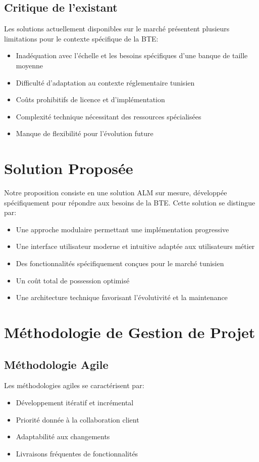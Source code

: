 \documentclass[12pt,a4paper]{report}
\begin{document}
\subsection{Critique de l'existant}
Les solutions actuellement disponibles sur le marché présentent plusieurs limitations pour le contexte spécifique de la BTE:
\begin{itemize}
    \item Inadéquation avec l'échelle et les besoins spécifiques d'une banque de taille moyenne
    \item Difficulté d'adaptation au contexte réglementaire tunisien
    \item Coûts prohibitifs de licence et d'implémentation
    \item Complexité technique nécessitant des ressources spécialisées
    \item Manque de flexibilité pour l'évolution future
\end{itemize}

\section{Solution Proposée}
Notre proposition consiste en une solution ALM sur mesure, développée spécifiquement pour répondre aux besoins de la BTE. Cette solution se distingue par:
\begin{itemize}
    \item Une approche modulaire permettant une implémentation progressive
    \item Une interface utilisateur moderne et intuitive adaptée aux utilisateurs métier
    \item Des fonctionnalités spécifiquement conçues pour le marché tunisien
    \item Un coût total de possession optimisé
    \item Une architecture technique favorisant l'évolutivité et la maintenance
\end{itemize}

\section{Méthodologie de Gestion de Projet}

\subsection{Méthodologie Agile}
Les méthodologies agiles se caractérisent par:
\begin{itemize}
    \item Développement itératif et incrémental
    \item Priorité donnée à la collaboration client
    \item Adaptabilité aux changements
    \item Livraisons fréquentes de fonctionnalités
\end{itemize}
\end{document}
